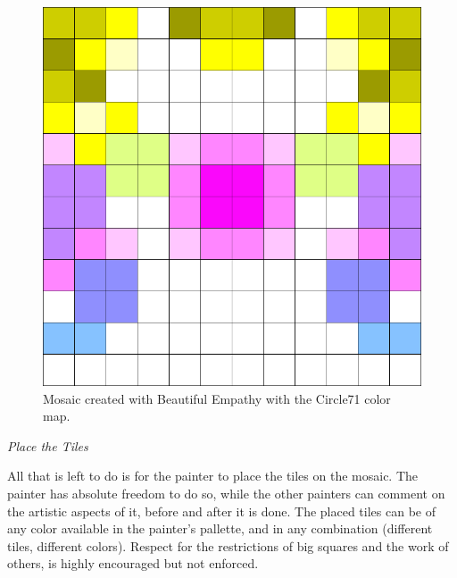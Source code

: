 \documentclass[twocolumn]{article}
\newcommand{\sublvl}[1]{\vspace{0.3cm}\large{\textit{#1}}\vspace{0.1cm}}
\begin{document}
\begin{figure}[b!]
\centering
\includegraphics[scale=0.25]{last_mosaic_sario.png}
\caption{Mosaic created with Beautiful Empathy with the Circle71 color map.}
\label{fig:mosaic}
\end{figure}


\sublvl{Place the Tiles}

All that is left to do is for the painter to place the tiles on the mosaic. The painter has absolute freedom to do so, while the other painters can comment on the artistic aspects of it, before and after it is done. The placed tiles can be of any color available in the painter's pallette, and in any combination (different tiles, different colors). Respect for the restrictions of big squares and the work of others, is highly encouraged but not enforced.
% 
% 
% 
% 
\end{document}
